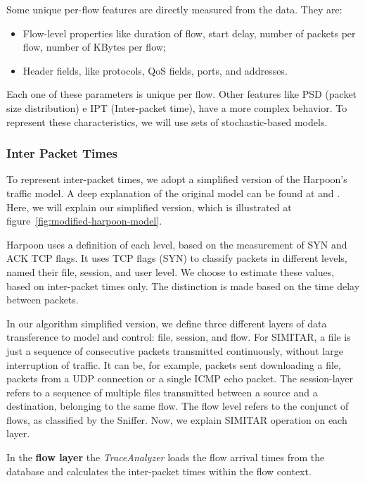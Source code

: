 Some unique per-flow features are directly measured from the data. They are:  

\begin{itemize}
\item Flow-level properties like duration of flow, start delay, number of packets per flow, number of KBytes per flow; 
\item Header fields, like protocols, QoS fields, ports, and addresses.
\end{itemize}

Each one of these parameters is unique per flow. Other features like PSD (packet size distribution) e IPT (Inter-packet time), have a more complex behavior.  To represent these characteristics, we will use sets of stochastic-based models.  


\subsubsection{Inter Packet Times}

To represent inter-packet times, we adopt a simplified version of the Harpoon's traffic model. A deep explanation of the original model can be found at \cite{harpoon-paper} and \cite{harpoon-validation}. Here, we will explain our simplified version, which is illustrated at figure~\ref{fig:modified-harpoon-model}. 

Harpoon uses a definition of each level, based on the measurement of SYN and ACK TCP flags. It uses TCP flags (SYN) to classify packets in different levels, named their file, session, and user level. We choose to estimate these values, based on inter-packet times only. The distinction is made based on the time delay between packets.


In our algorithm simplified version, we define three different layers of data transference to model and control: file, session, and flow. For SIMITAR, a file is just a sequence of consecutive packets transmitted continuously, without large interruption of traffic. It can be, for example, packets sent downloading a file, packets from a  UDP  connection or a single ICMP echo packet. The session-layer refers to a sequence of multiple files transmitted between a source and a destination, belonging to the same flow.  The flow level refers to the conjunct of flows, as classified by the Sniffer.  Now, we explain SIMITAR operation on each layer. 


In the \textbf{flow layer} the \textit{TraceAnalyzer} loads the flow arrival times from the database and calculates the inter-packet times within the flow context. 



